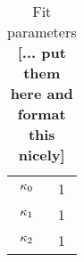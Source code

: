 \documentclass[letterpaper,twocolumn,amsmath,amssymb,pre,aps,10pt]{revtex4-1}
\newcommand{\red}[1]{{\bf \color{red} #1}}
\newcommand{\rr}{\textbf{r}}
\newcommand{\fixme}[1]{\red{[#1]}}
\begin{document}
\begin{table}
  \begin{tabular}{cc}
    $\kappa_0$ & 1 \\
    $\kappa_1$ & 1 \\
    $\kappa_2$ & 1 \\
  \end{tabular}
  \caption{Fit parameters \fixme{... put them here and format this nicely}}
  \label{tab:fit-parameters}
\end{table}

\end{document}
